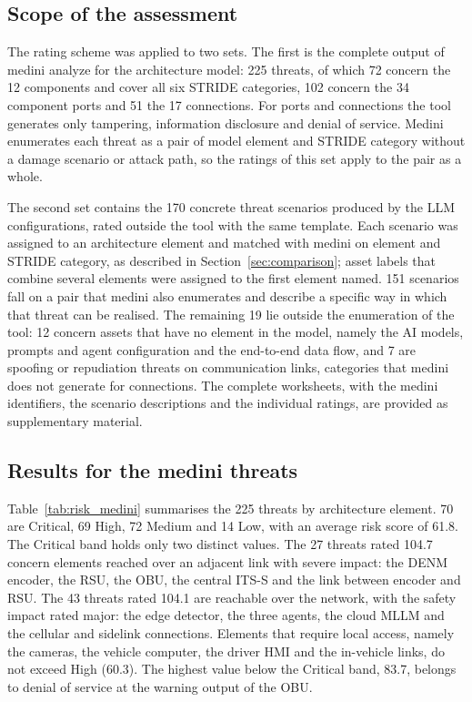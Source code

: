 \subsection{Scope of the assessment}

The rating scheme was applied to two sets. The first is the complete output of
medini analyze for the architecture model: 225 threats, of which 72 concern the
12 components and cover all six STRIDE categories, 102 concern the 34 component
ports and 51 the 17 connections. For ports and connections the tool generates
only tampering, information disclosure and denial of service. Medini enumerates
each threat as a pair of model element and STRIDE category without a damage
scenario or attack path, so the ratings of this set apply to the pair as a
whole.

The second set contains the 170 concrete threat scenarios produced by the LLM
configurations, rated outside the tool with the same template. Each scenario
was assigned to an architecture element and matched with medini on element and
STRIDE category, as described in Section~\ref{sec:comparison}; asset labels
that combine several elements were assigned to the first element named. 151
scenarios fall on a pair that medini also enumerates and describe a specific
way in which that threat can be realised. The remaining 19 lie outside the
enumeration of the tool: 12 concern assets that have no element in the model,
namely the AI models, prompts and agent configuration and the end-to-end data
flow, and 7 are spoofing or repudiation threats on communication links,
categories that medini does not generate for connections. The complete
worksheets, with the medini identifiers, the scenario descriptions and the
individual ratings, are provided as supplementary material.

\subsection{Results for the medini threats}

Table~\ref{tab:risk_medini} summarises the 225 threats by architecture element.
70 are Critical, 69 High, 72 Medium and 14 Low, with an average risk score of
61.8. The Critical band holds only two distinct values. The 27 threats rated
104.7 concern elements reached over an adjacent link with severe impact: the
DENM encoder, the RSU, the OBU, the central ITS-S and the link between encoder
and RSU. The 43 threats rated 104.1 are reachable over the network, with the
safety impact rated major: the edge detector, the three agents, the cloud MLLM
and the cellular and sidelink connections. Elements that require local access,
namely the cameras, the vehicle computer, the driver HMI and the in-vehicle
links, do not exceed High (60.3). The highest value below the Critical band,
83.7, belongs to denial of service at the warning output of the OBU.

